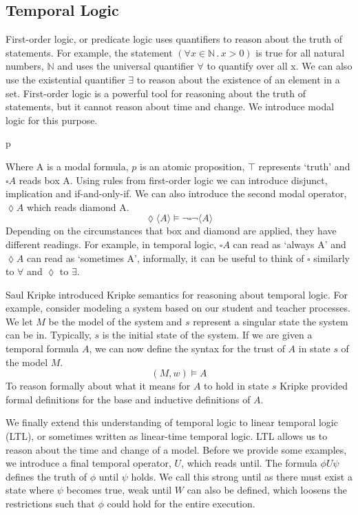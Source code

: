 \subsection{Temporal Logic}
First-order logic, or predicate logic uses quantifiers to reason about the truth of statements. For example, the statement $(\forall x \in \mathbb{N} \,.\, x > 0)$ is true for all natural numbers, $\mathbb{N}$ and uses the universal quantifier $\forall$ to quantify over all x. We can also use the existential quantifier $\exists$ to reason about the existence of an element in a set. First-order logic is a powerful tool for reasoning about the truth of statements, but it cannot reason about time and change. We introduce modal logic for this purpose.
\begin{bnf*}
      {p \bnfor \top \bnfor \neg {} \bnfor {} \land {} \bnfor \square {}}\\
\end{bnf*}
Where A is a modal formula, $p$ is an atomic proposition, $\top$ represents `truth' and $\square A$ reads box A. Using rules from first-order logic we can introduce disjunct, implication and if-and-only-if. We can also introduce the second modal operator, $\lozenge A$ which reads diamond A.
\[
\lozenge \langle A \rangle \models \neg \square \neg \langle A \rangle
\]
Depending on the circumstances that box and diamond are applied, they have different readings. For example, in temporal logic, $\square A$ can read as `always A' and $\lozenge A$ can read as `sometimes A', informally, it can be useful to think of $\square$ similarly to $\forall$ and $\lozenge$ to $\exists$.
\par
Saul Kripke introduced Kripke semantics \cite{kripke} for reasoning about temporal logic. For example, consider modeling a system based on our student and teacher processes. We let $M$ be the model of the system and $s$ represent a singular state the system can be in. Typically, $s$ is the initial state of the system. If we are given a temporal formula $A$, we can now define the syntax for the trust of $A$ in state $s$ of the model $M$.
\[
(M, w) \models A
\]
To reason formally about what it means for $A$ to hold in state $s$ Kripke provided formal definitions for the base and inductive definitions of $A$.
\par
We finally extend this understanding of temporal logic to linear temporal logic (LTL), or sometimes written as linear-time temporal logic. LTL allows us to reason about the time and change of a model. Before we provide some examples, we introduce a final temporal operator, $U$, which reads until. The formula $\phi U \psi$ defines the truth of $\phi$ until $\psi$ holds. We call this strong until as there must exist a state where $\psi$ becomes true, weak until $W$ can also be defined, which loosens the restrictions such that $\phi$ could hold for the entire execution.
